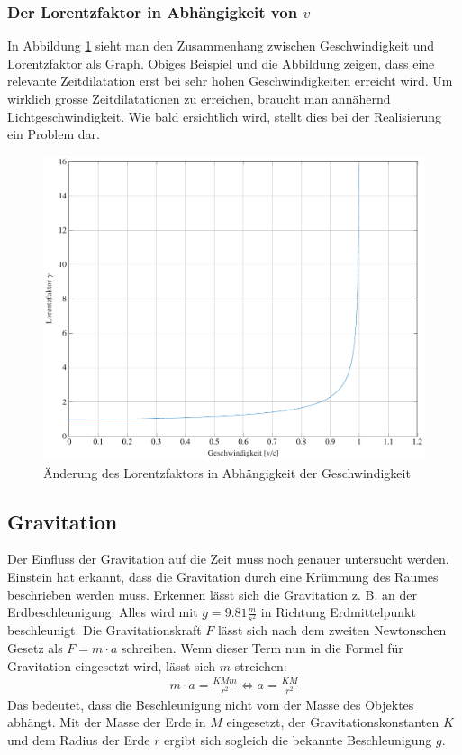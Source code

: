 \begin{refsection}
\subsubsection{Der Lorentzfaktor in Abhängigkeit von $v$}
In Abbildung \ref{skript:zeitreisen:fig:lorentz} sieht man den Zusammenhang zwischen Geschwindigkeit und Lorentzfaktor als Graph. Obiges Beispiel und die Abbildung zeigen, dass eine relevante Zeitdilatation erst bei sehr hohen Geschwindigkeiten erreicht wird. Um wirklich grosse Zeitdilatationen zu erreichen, braucht man annähernd Lichtgeschwindigkeit. Wie bald ersichtlich wird, stellt dies bei der Realisierung ein Problem dar.
\begin{figure}[H]
   \centering
   \includegraphics[width=12cm]{zeitreisen/tikz/lorentz.pdf}
   \caption{Änderung des Lorentzfaktors in Abh\"angigkeit der Geschwindigkeit}
   \label{skript:zeitreisen:fig:lorentz} 
\end{figure}
\subsection{Gravitation} \label{Gravitation}
	Der Einfluss der Gravitation auf die Zeit muss noch genauer untersucht werden. Einstein hat erkannt, dass die Gravitation durch eine Krümmung des Raumes beschrieben werden muss. Erkennen lässt sich die Gravitation z. B. an der Erdbeschleunigung. Alles wird mit $g=9.81\frac{m}{s^2}$ in Richtung Erdmittelpunkt beschleunigt. Die Gravitationskraft $F$ lässt sich nach dem zweiten Newtonschen Gesetz als $F=m\cdot a$ schreiben. Wenn dieser Term nun in die Formel für Gravitation eingesetzt wird, lässt sich $m$ streichen: 
	\begin{align*}
		m\cdot a = \frac{KMm}{r^2} \Leftrightarrow a=\frac{KM}{r^2} 
	\end{align*}
    Das bedeutet, dass die Beschleunigung nicht vom der Masse des Objektes abhängt. Mit der Masse der Erde in $M$ eingesetzt, der Gravitationskonstanten $K$ und dem Radius der Erde $r$ ergibt sich sogleich die bekannte Beschleunigung $g$.
    

\end{refsection}
